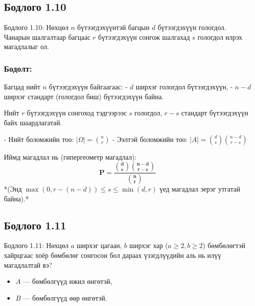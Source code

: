 \documentclass[11pt,a4paper]{article}
\begin{document}
\vspace{0.8em}

\subsection*{Бодлого 1.10}

\begin{problembox}{Бодлого 1.10: Нөхцөл}
$n$ бүтээгдэхүүнтэй багцын $d$ бүтээгдэхүүн гологдол. Чанарын шалгалтаар багцаас $r$ бүтээгдэхүүн сонгож шалгахад $s$ гологдол илрэх магадлалыг ол.
\end{problembox}

\subsubsection*{Бодолт:}

Багцад нийт $n$ бүтээгдэхүүн байгаагаас:
- $d$ ширхэг гологдол бүтээгдэхүүн,
- $n - d$ ширхэг стандарт (гологдол биш) бүтээгдэхүүн байна.

Нийт $r$ бүтээгдэхүүн сонгоход тэдгээрээс $s$ гологдол, $r - s$ стандарт бүтээгдэхүүн байх шаардлагатай.

- Нийт боломжийн тоо: $|\Omega| = \binom{n}{r}$
- Ээлтэй боломжийн тоо: $|A| = \binom{d}{s} \binom{n-d}{r-s}$

Иймд магадлал нь (гипергеометр магадлал):
\[
  \mathbf{P = \frac{\binom{d}{s}\binom{n-d}{r-s}}{\binom{n}{r}}}
\]
*(Энд $\max(0, r - (n - d)) \le s \le \min(d, r)$ үед магадлал эерэг утгатай байна).*

\vspace{0.8em}

\subsection*{Бодлого 1.11}

\begin{problembox}{Бодлого 1.11: Нөхцөл}
$a$ ширхэг цагаан, $b$ ширхэг хар ($a \ge 2, b \ge 2$) бөмбөлөгтэй хайрцгаас хоёр бөмбөлөг сонгосон бол дараах үзэгдлүүдийн аль нь илүү магадлалтай вэ?
\begin{itemize}[leftmargin=1.8em, itemsep=1pt]
  \item $A$ — бөмбөлгүүд ижил өнгөтэй,
  \item $B$ — бөмбөлгүүд өөр өнгөтэй.
\end{itemize}
\end{problembox}
\end{document}
